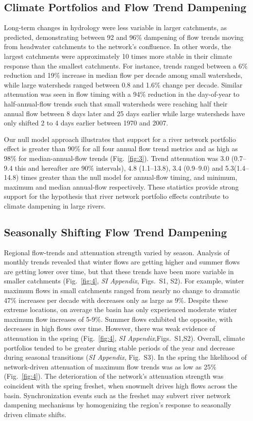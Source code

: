 \documentclass[9pt,twocolumn,twoside,lineno]{pnas-new}
\begin{document}
\subsection*{Climate Portfolios and Flow Trend Dampening} Long-term changes in hydrology were less variable in larger catchments, as predicted, demonstrating between 92 and 96\% dampening of flow trends moving from headwater catchments to the network's confluence. In other words, the largest catchments were approximately 10 times more stable in their climate response than the smallest catchments. For instance, trends ranged between a 6\% reduction and 19\% increase in median flow per decade among small watersheds, while large watersheds ranged between 0.8 and 1.6\% change per decade. Similar attenuation was seen in flow timing with a 94\% reduction in the day-of-year to half-annual-flow trends such that small watersheds were reaching half their annual flow between 8 days later and 25 days earlier while large watersheds have only shifted 2 to 4 days earlier between 1970 and 2007.

Our null model approach illustrates that support for a river network portfolio effect is greater than 90\% for all four annual flow trend metrics and as high as 98\% for median-annual-flow trends (Fig.~\ref{fig:3}). Trend attenuation was 3.0 (0.7--9.4 this and hereafter are 90\% intervals), 4.8 (1.1--13.8), 3.4 (0.9--9.0) and 5.3(1.4--14.8) times greater than the null model for annual-flow timing, and minimum, maximum and median annual-flow respectively. These statistics provide strong support for the hypothesis that river network portfolio effects contribute to climate dampening in large rivers.

\subsection*{Seasonally Shifting Flow Trend Dampening} Regional flow-trends and attenuation strength varied by season. Analysis of monthly trends revealed that winter flows are getting higher and summer flows are getting lower over time, but that these trends have been more variable in smaller catchments (Fig.~\ref{fig:4}, \textit{SI Appendix}, Figs.~S1, S2). For example, winter maximum flows in small catchments ranged from nearly no change to dramatic 47\% increases per decade with decreases only as large as 9\%. Despite these extreme locations, on average the basin has only experienced moderate winter maximum flow increases of 5-9\%. Summer flows exhibited the opposite, with decreases in high flows over time. However, there was weak evidence of attenuation in the spring (Fig.~\ref{fig:4}, \textit{SI Appendix},Figs.~S1,S2). Overall, climate portfolios tended to be greater during stable periods of the year and decrease during seasonal transitions (\textit{SI Appendix}, Fig.~S3). In the spring the likelihood of network-driven attenuation of maximum flow trends was as low as 25\% (Fig.~\ref{fig:4}). The deterioration of the network's attenuation strength was coincident with the spring freshet, when snowmelt drives high flows across the basin. Synchronization events such as the freshet may subvert river network dampening mechanisms by homogenizing the region's response to seasonally driven climate shifts.
 
\end{document}
